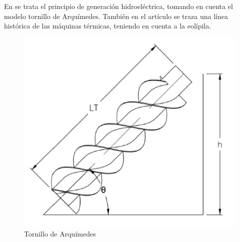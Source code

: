 En \cite{cuenca2023diseno} se trata el principio de generación hidroeléctrica, tomando en cuenta el modelo tornillo de Arquímedes. También en el artículo \cite{giri2020maquinas} se traza una línea histórica de las máquinas térmicas, teniendo en cuenta a la eolípila. 

\begin{figure}[ht!]
	\centering
	\begin{minipage}{0.3\linewidth}
		\centering
		\includegraphics[width=\linewidth]{figs/arquimedes.png}
		\caption*{\centering Tornillo de Arquímedes}  %
	\end{minipage}
	\hspace{3cm}
	\begin{minipage}{0.3\linewidth}
		\centering

\end{minipage}
\end{figure}
